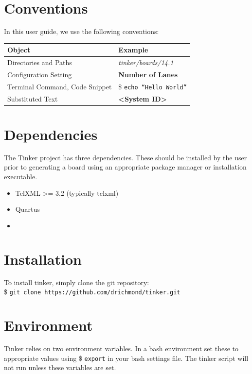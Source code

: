 \documentclass{refrep}
\newcommand{\Directory}[1]{\textit{#1}}
\newcommand{\TermCmd}[1]{\$ \texttt{#1}}
\newcommand{\Subst}[1]{\textbf{\textless{#1}\textgreater}}
\newcommand{\ConfigSetting}[1]{\textbf{#1}}
\begin{document}
\section{Conventions}
\label{Chapter:Setup:Section:Conventions}
In this user guide, we use the following conventions:
\begin{center}
  \begin{tabular}{ | l | l |}
    \hline
    Object & Example \\ \hline
    Directories and Paths & \Directory{tinker/boards/14.1}  \\ \hline
    Configuration Setting & \ConfigSetting{Number of Lanes} \\ \hline
    Terminal Command, Code Snippet & \TermCmd{echo ``Hello World''}\\ \hline
    Substituted Text & \Subst{System ID} \\ \hline
  \end{tabular}
\end{center}

\section{Dependencies}
\label{Chapter:Setup:Section:Dependencies}

The Tinker project has three dependencies. These should be installed by the user
prior to generating a board using an appropriate package manager or installation
executable.

\begin{itemize}
\item TclXML >= 3.2 (typically tclxml)
\item Quartus
\item
\end{itemize}

\section{Installation}
\label{Chapter:Setup:Section:Installation}

To install tinker, simply clone the git repository:\\

\TermCmd{git clone https://github.com/drichmond/tinker.git}\\

\section{Environment}
\label{Chapter:Setup:Section:Environment}
Tinker relies on two environment variables. In a bash environment set these to
appropriate values using \TermCmd{export} in your bash settings file. The tinker
script will not run unless these variables are set.
\end{document}
